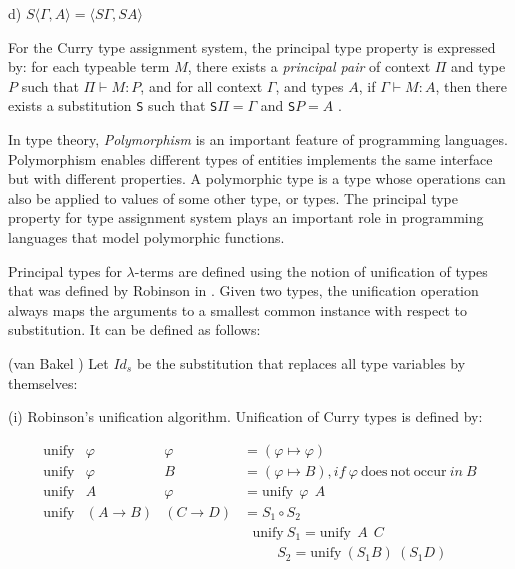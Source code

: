 d) $S\langle \Gamma, A\rangle=\langle S\Gamma, SA\rangle$

For the Curry type assignment system, the principal type property is expressed by: for each typeable term $M$, there exists a \textit{principal pair} of context $\Pi$ and type $P$ such that $\Pi \vdash M:P$, and for all context $\Gamma$, and types $A$, if $\Gamma \vdash M:A$, then there exists a substitution \texttt{S} such that \texttt{S}$\Pi=\Gamma$ and \texttt{S}$P=A$ \cite{svb2001type}.

In type theory, \textit{Polymorphism} is an important feature of programming languages. Polymorphism enables different types of entities implements the same interface but with different properties. A polymorphic type is a type whose operations can also be applied to values of some other type, or types. The principal type property for type assignment system plays an important role in programming languages that model polymorphic functions.   

Principal types for $\lambda$-terms are defined using the notion of unification of types that was defined by Robinson in \cite{robinson1965machine}. Given two types, the unification operation always maps the arguments to a smallest common instance with respect to substitution. It can be defined as follows:

\begin{def1}\label{eq:rob}
\normalfont (van Bakel \cite{svb2001type}) Let $Id_s$ be the substitution that replaces all type variables by themselves:
\end{def1}

\noindent (i) Robinson's unification algorithm. Unification of Curry types is defined by:

\begin{equation*}
\begin{array}{llll}
\mathrm{unify} & \varphi            & \varphi          & = (\varphi \mapsto \varphi)\\
\mathrm{unify} & \varphi            & B                & = (\varphi \mapsto B), if\ \varphi \mathrm{\ does\ not\ occur}\ in\ B\\
\mathrm{unify} & A                  & \varphi          & = \mathrm{unify}\ \ \varphi\ \ A\\
\mathrm{unify} & (A\rightarrow B)   & (C\rightarrow D) & = S_1\circ S_2\\
&&&\ \ \ \mathrm{unify}\ S_1 = \mathrm{unify}\ \ A\ \ C\\
&&&\ \ \ \ \ \ \ \ \ \ \ S_2 = \mathrm{unify}\ (S_1B)\ (S_1D)
\end{array}
\end{equation*}


